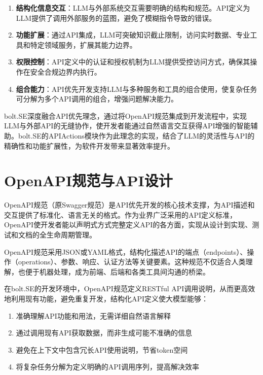 \begin{enumerate}
  \item \textbf{结构化信息交互}：LLM与外部系统交互需要明确的结构和规范。API定义为LLM提供了调用外部服务的蓝图，避免了模糊指令导致的错误。
  
  \item \textbf{功能扩展}：通过API集成，LLM可突破知识截止限制，访问实时数据、专业工具和特定领域服务，扩展其能力边界。
  
  \item \textbf{权限控制}：API定义中的认证和授权机制为LLM提供受控访问方式，确保其操作在安全合规边界内执行。
    
  \item \textbf{组合能力}：API优先开发支持LLM与多种服务和工具的组合使用，使复杂任务可分解为多个API调用的组合，增强问题解决能力。
\end{enumerate}

bolt.SE深度融合API优先理念，通过将OpenAPI规范集成到开发流程中，实现LLM与外部API的无缝协作，使开发者能通过自然语言交互获得API增强的智能辅助。bolt.SE的APIActions模块作为此理念的实现，结合了LLM的灵活性与API的精确性和功能扩展性，为软件开发带来显著效率提升。

\section{OpenAPI规范与API设计}
OpenAPI规范（原Swagger规范）是API优先开发的核心技术支撑，为API描述和交互提供了标准化、语言无关的格式\cite{openapi2023}。作为业界广泛采用的API定义标准，OpenAPI使开发者能以声明式方式完整定义API的各方面，实现从设计到实现、测试和文档的全生命周期管理。

OpenAPI规范采用JSON或YAML格式，结构化描述API的端点（endpoints）、操作（operations）、参数、响应、认证方法等关键要素。这种规范不仅适合人类理解，也便于机器处理，成为前端、后端和各类工具间沟通的桥梁。

在bolt.SE的开发环境中，OpenAPI规范定义RESTful API调用说明，从而更高效地利用现有功能，避免重复开发，结构化API定义使大模型能够：
\begin{enumerate}
  \item 准确理解API功能和用法，无需详细自然语言解释
  \item 通过调用现有API获取数据，而非生成可能不准确的信息
  \item 避免在上下文中包含冗长API使用说明，节省token空间
  \item 将复杂任务分解为定义明确的API调用序列，提高解决效率
\end{enumerate}

